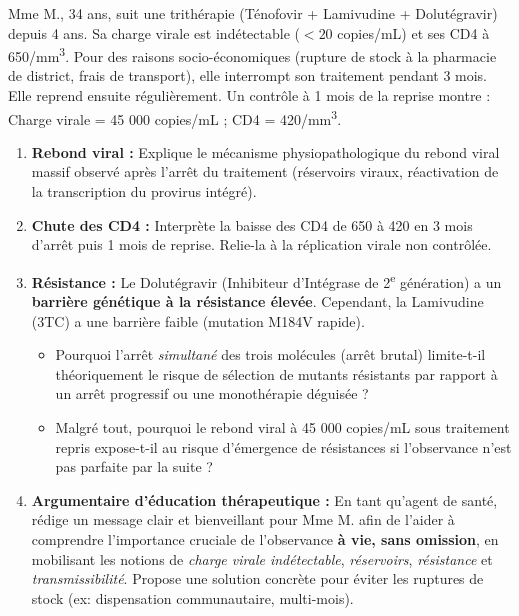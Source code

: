\documentclass[11pt]{article}
\begin{document}
\begin{exercice}
Mme M., 34 ans, suit une trithérapie (Ténofovir + Lamivudine + Dolutégravir) depuis 4 ans. Sa charge virale est indétectable ($< 20$ copies/mL) et ses CD4 à 650/mm\textsuperscript{3}. Pour des raisons socio-économiques (rupture de stock à la pharmacie de district, frais de transport), elle interrompt son traitement pendant 3 mois. Elle reprend ensuite régulièrement. Un contrôle à 1 mois de la reprise montre : Charge virale = 45 000 copies/mL ; CD4 = 420/mm\textsuperscript{3}.

\begin{enumerate}
    \item \textbf{Rebond viral :} Explique le mécanisme physiopathologique du rebond viral massif observé après l'arrêt du traitement (réservoirs viraux, réactivation de la transcription du provirus intégré).
    \item \textbf{Chute des CD4 :} Interprète la baisse des CD4 de 650 à 420 en 3 mois d'arrêt puis 1 mois de reprise. Relie-la à la réplication virale non contrôlée.
    \item \textbf{Résistance :} Le Dolutégravir (Inhibiteur d'Intégrase de 2\textsuperscript{e} génération) a un \textbf{barrière génétique à la résistance élevée}. Cependant, la Lamivudine (3TC) a une barrière faible (mutation M184V rapide).
    \begin{itemize}
        \item Pourquoi l'arrêt \emph{simultané} des trois molécules (arrêt brutal) limite-t-il théoriquement le risque de sélection de mutants résistants par rapport à un arrêt progressif ou une monothérapie déguisée ?
        \item Malgré tout, pourquoi le rebond viral à 45 000 copies/mL sous traitement repris expose-t-il au risque d'émergence de résistances si l'observance n'est pas parfaite par la suite ?
    \end{itemize}
    \item \textbf{Argumentaire d'éducation thérapeutique :} En tant qu'agent de santé, rédige un message clair et bienveillant pour Mme M. afin de l'aider à comprendre l'importance cruciale de l'observance \textbf{à vie, sans omission}, en mobilisant les notions de \emph{charge virale indétectable}, \emph{réservoirs}, \emph{résistance} et \emph{transmissibilité}. Propose une solution concrète pour éviter les ruptures de stock (ex: dispensation communautaire, multi-mois).
\end{enumerate}
\end{exercice}
\end{document}
